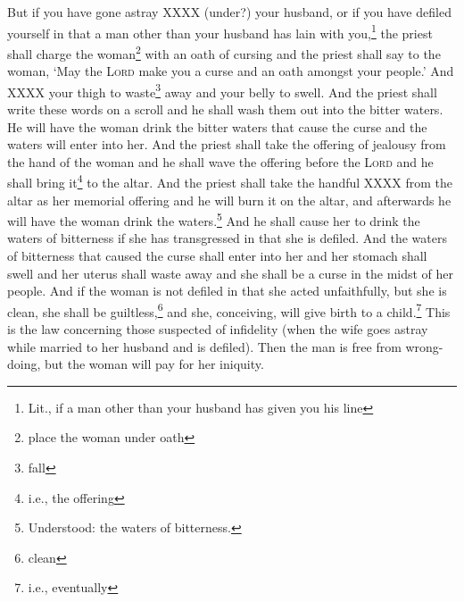 \begin{enumerate}
     But if you have gone astray XXXX (under?) your husband, or if you have defiled yourself in that a man other than your husband has lain with you,\footnote{Lit., if a man other than your husband has given you his line}%
     the priest shall charge the woman\footnote{place the woman under oath} with an oath of cursing and the priest shall say to the woman, `May the \textsc{Lord} make you a curse and an oath amongst your people.' And XXXX your thigh to waste\footnote{fall} away and your belly to swell.%
     And the priest shall write these words on a scroll and he shall wash them out into the bitter waters.%
     He will have the woman drink the bitter waters that cause the curse and the waters will enter into her.%
     And the priest shall take the offering of jealousy from the hand of the woman and he shall wave the offering before the \textsc{Lord} and he shall bring it\footnote{i.e., the offering} to the altar.%
     And the priest shall take the handful XXXX from the altar as her memorial offering and he will burn it on the altar, and afterwards he will have the woman drink the waters.\footnote{Understood: the waters of bitterness.}%
     And he shall cause her to drink the waters of bitterness if she has transgressed in that she is defiled. And the waters of bitterness that caused the curse shall enter into her and her stomach shall swell and her uterus shall waste away and she shall be a curse in the midst of her people.%
     And if the woman is not defiled in that she acted unfaithfully, but she is clean, she shall be guiltless,\footnote{clean} and she, conceiving, will give birth to a child.\footnote{i.e., eventually}%
     This is the law concerning those suspected of infidelity (when the wife goes astray while married to her husband and is defiled).%
     Then the man is free from wrong-doing, but the woman will pay for her iniquity.%
\end{enumerate}
